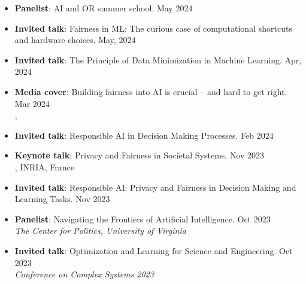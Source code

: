 \begin{itemize}
  \item {\bf Panelist}: {AI and OR summer school.} \hfill{May 2024}\\

  \item {\bf Invited talk}: Fairness in ML: The curious case of computational shortcuts and hardware choices. \hfill{May, 2024}\\

  \item {\bf Invited talk}: The Principle of Data Minimization in Machine Learning. \hfill{Apr, 2024}\\
  {}

  \item {\bf Media cover}: 
  {Building fairness into AI is crucial – and hard to get right.} \hfill {Mar 2024} \\
  , 

  \item {\bf Invited talk}: Responsible AI in Decision Making Processes. \hfill{Feb 2024}\\
  {}
  
  \item {\bf Keynote talk}: {Privacy and Fairness in Societal Systems.} \hfill{Nov 2023}\\
  {, INRIA, France}

  \item {\bf Invited talk}: {Responsible AI: Privacy and Fairness in Decision Making and Learning Tasks.} \hfill{Nov 2023}\\
  {}

  \item {\bf Panelist}: {Navigating the Frontiers of Artificial Intelligence.} \hfill{Oct 2023}\\
  {\em  The Center for Politics, University of Virginia}

  \item {\bf Invited talk}: {Optimization and Learning for Science and Engineering.} \hfill{Oct 2023}\\
  {\em  Conference on Complex Systems 2023}


\end{itemize}
